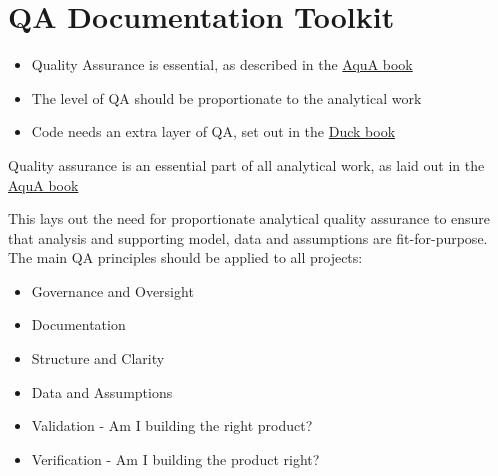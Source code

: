 \documentclass[
  letterpaper,
]{book}
\providecommand{\tightlist}{%
  \setlength{\itemsep}{0pt}\setlength{\parskip}{0pt}}\usepackage{longtable,booktabs,array}
\begin{document}

\hypertarget{sec-qa}{%
\chapter{QA Documentation Toolkit}\label{sec-qa}}

\begin{tcolorbox}[enhanced jigsaw, toprule=.15mm, left=2mm, colback=white, breakable, title=\textcolor{quarto-callout-note-color}{\faInfo}\hspace{0.5em}{Key Points}, colframe=quarto-callout-note-color-frame, opacitybacktitle=0.6, coltitle=black, titlerule=0mm, bottomrule=.15mm, rightrule=.15mm, bottomtitle=1mm, toptitle=1mm, arc=.35mm, leftrule=.75mm, opacityback=0, colbacktitle=quarto-callout-note-color!10!white]

\begin{itemize}
\item
  Quality Assurance is essential, as described in the
  \href{https://www.gov.uk/government/publications/the-aqua-book-guidance-on-producing-quality-analysis-for-government}{AquA
  book}
\item
  The level of QA should be proportionate to the analytical work
\item
  Code needs an extra layer of QA, set out in the
  \href{https://best-practice-and-impact.github.io/qa-of-code-guidance/intro.html}{Duck
  book}
\end{itemize}

\end{tcolorbox}

Quality assurance is an essential part of all analytical work, as laid
out in the
\href{https://www.gov.uk/government/publications/the-aqua-book-guidance-on-producing-quality-analysis-for-government}{AquA
book}

This lays out the need for proportionate analytical quality assurance to
ensure that analysis and supporting model, data and assumptions are
fit-for-purpose. The main QA principles should be applied to all
projects:

\begin{itemize}
\tightlist
\item
  Governance and Oversight
\item
  Documentation
\item
  Structure and Clarity
\item
  Data and Assumptions
\item
  Validation - Am I building the right product?
\item
  Verification - Am I building the product right?
\end{itemize}
\end{document}
